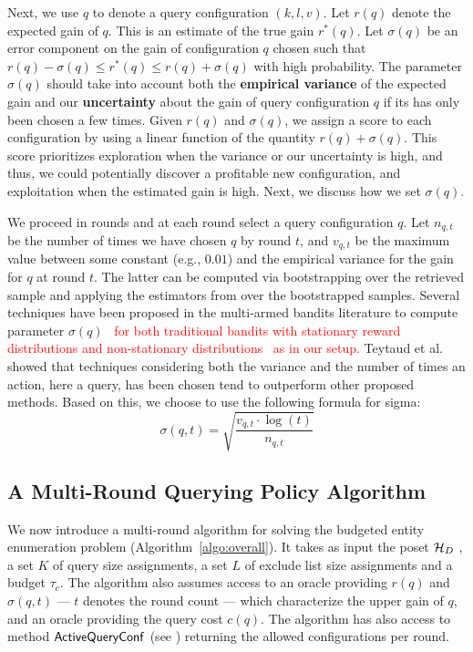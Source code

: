 Next, we use $q$ to denote a query configuration $(k,l,v)$. Let $r(q)$ denote the expected gain of $q$. This is an estimate of the true gain $r^*(q)$. Let $\sigma(q)$ be an error component on the gain of configuration $q$ chosen such that $r(q) - \sigma(q) \leq r^*(q) \leq r(q) + \sigma(q)$ with high probability. The parameter $\sigma(q)$ should take into account both the {\bf empirical variance} of the expected gain and our {\bf uncertainty} about the gain of query configuration $q$ if its has only been chosen a few times. Given $r(q)$ and $\sigma(q)$, we assign a score to each configuration by using a linear function of the quantity $r(q) + \sigma(q)$. This score prioritizes exploration when the variance or our uncertainty is high, and thus, we could potentially discover a profitable new configuration, and exploitation when the estimated gain is high. Next, we discuss how we set $\sigma(q)$.

We proceed in rounds and at each round select a query configuration $q$. Let $n_{q,t}$ be the number of times we have chosen $q$ by round $t$, and $v_{q,t}$ be the maximum value between some constant (e.g., $0.01$) and the empirical variance for the gain for $q$ at round $t$. The latter can be computed via bootstrapping over the retrieved sample and applying the estimators from  over the bootstrapped samples. Several techniques have been proposed in the multi-armed bandits literature to compute parameter $\sigma(q)$~\cite{teytaud:inria-00173263} \textcolor{red}{for both traditional bandits with stationary reward distributions and non-stationary distributions~\cite{besbes2014stochastic} as in our setup.} Teytaud et al.~\cite{teytaud:inria-00173263} showed that techniques considering both the variance and the number of times an action, here a query, has been chosen tend to outperform other proposed methods. Based on this, we choose to use the following formula for sigma:
\begin{equation}
\label{eq:upper}
\sigma(q,t) = \sqrt{\frac{v_{q,t}\cdot\log(t)}{n_{q,t}}}
\end{equation}

\subsection{A Multi-Round Querying Policy Algorithm}
\label{sec:heuristic}

We now introduce a multi-round algorithm for solving the budgeted entity enumeration problem (Algorithm~\ref{algo:overall}). It takes as input the poset $\mathcal{H}_D$ , a set $K$ of query size assignments, a set $L$ of exclude list size assignments and a budget $\tau_c$. The algorithm also assumes access to an oracle providing $r(q)$ and $\sigma(q,t)$ --- $t$ denotes the round count ---  which characterize the upper gain of $q$, and an oracle providing the query cost $c(q)$. The algorithm has also access to method ${\sf ActiveQueryConf}$ (see ) returning the allowed configurations per round.

